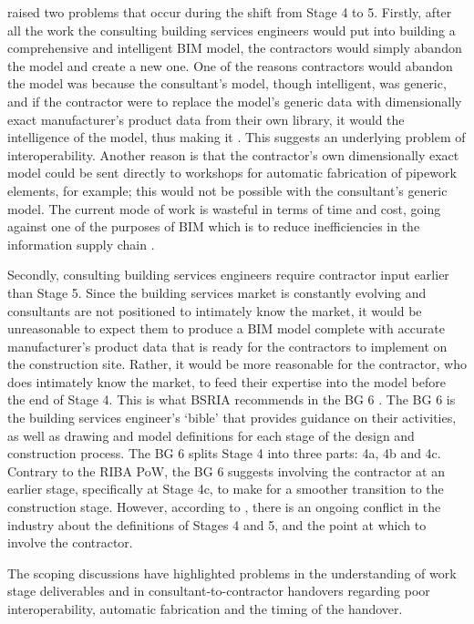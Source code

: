 \cite{Conaghan2017} raised two problems that occur during the shift from Stage 4 to 5.
Firstly, after all the work the consulting building services engineers would put into building a comprehensive and intelligent BIM model, the contractors would simply abandon the model and create a new one.
One of the reasons contractors would abandon the model was because the consultant's model, though intelligent, was generic, and if the contractor were to replace the model's generic data with dimensionally exact manufacturer's product data from their own library, it would  the intelligence of the model, thus making it .
This suggests an underlying problem of interoperability.
Another reason is that the contractor's own dimensionally exact model could be sent directly to workshops for automatic fabrication of pipework elements, for example; this would not be possible with the consultant's generic model.
The current mode of work is wasteful in terms of time and cost, going against one of the purposes of BIM which is to reduce inefficiencies in the information supply chain \citep{NBS2014}.

Secondly, consulting building services engineers require contractor input earlier than Stage 5.
Since the building services market is constantly evolving and consultants are not positioned to intimately know the market, it would be unreasonable to expect them to produce a BIM model complete with accurate manufacturer's product data that is ready for the contractors to implement on the construction site.
Rather, it would be more reasonable for the contractor, who does intimately know the market, to feed their expertise into the model before the end of Stage 4.
This is what BSRIA recommends in the BG 6 \citep{BG62014}.
The BG 6 is the building services engineer's `bible' that provides guidance on their activities, as well as drawing and model definitions for each stage of the design and construction process.
The BG 6 splits Stage 4 into three parts: 4a, 4b and 4c. 
Contrary to the RIBA PoW, the BG 6 suggests involving the contractor at an earlier stage, specifically at Stage 4c, to make for a smoother transition to the construction stage.
However, according to \cite{Conaghan2017}, there is an ongoing conflict in the industry about the definitions of Stages 4 and 5, and the point at which to involve the contractor.

The scoping discussions have highlighted problems in the understanding of work stage deliverables and in consultant-to-contractor handovers regarding poor interoperability, automatic fabrication and the timing of the handover.
